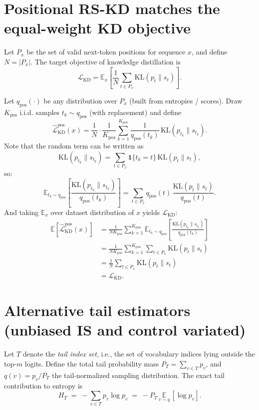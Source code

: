 \documentclass[11pt]{article}
\begin{document}



\appendix
\section{Positional RS-KD matches the equal-weight KD objective}
\label{app:pos-rs-kd-proof}

Let \(P_x\) be the set of valid next-token positions for sequence \(x\), and define \(N=\lvert P_x\rvert\).
The target objective of knowledge distillation is
\[
	\mathcal{L}_{\text{KD}}
	=\mathbb{E}_{x}\!\left[\frac{1}{N}\sum_{t\in P_x}\mathrm{KL}(p_t\|s_t)\right].
\]

Let \(q_{\text{pos}}(\cdot)\) be any distribution over \(P_x\) (built from entropies / scores).
Draw \(K_{\text{pos}}\) i.i.d. samples \(t_k\sim q_{\text{pos}}\) (with replacement) and define
\[
	\widehat{\mathcal{L}}_{\text{KD}}^{\text{pos}}(x)
	=\frac{1}{N}\cdot\frac{1}{K_{\text{pos}}}\sum_{k=1}^{K_{\text{pos}}}
	\frac{1}{q_{\text{pos}}(t_k)}\,\mathrm{KL}(p_{t_k}\|s_{t_k}).
\]
Note that the random term can be written as
\[
	\mathrm{KL}(p_{t_k}\|s_{t_k})
	=\sum_{t\in P_x}\mathbf{1}\!\{t_k=t\}\,\mathrm{KL}(p_t\|s_t),
\]
so:
\[
	\mathbb{E}_{t_k\sim q_{\text{pos}}}\!\left[
		\frac{\mathrm{KL}(p_{t_k}\|s_{t_k})}{q_{\text{pos}}(t_k)}
		\right]
	= \sum_{t\in P_x} q_{\text{pos}}(t)\,
	\frac{\mathrm{KL}(p_t\|s_t)}{q_{\text{pos}}(t)}.
\]
And taking \(\mathbb{E}_x\) over dataset distribution of \(x\) yields \(\mathcal{L}_{\text{KD}}\):
\begin{align*}
	\mathbb{E}\!\left[\widehat{\mathcal{L}}_{\text{KD}}^{\text{pos}}(x)\right]
	 & = \frac{1}{N K_{\text{pos}}}\sum_{k=1}^{K_{\text{pos}}}
	\mathbb{E}_{t_k\sim q_{\text{pos}}}\!\left[
		\frac{\mathrm{KL}(p_{t_k}\|s_{t_k})}{q_{\text{pos}}(t_k)}
	\right]                                                     \\
	 & = \frac{1}{N K_{\text{pos}}}\sum_{k=1}^{K_{\text{pos}}}
	\sum_{t\in P_x}\mathrm{KL}(p_t\|s_t)                        \\
	 & = \frac{1}{N}\sum_{t\in P_x}\mathrm{KL}(p_t\|s_t)        \\
	 & =\mathcal{L}_{\text{KD}}.
\end{align*}

\section{Alternative tail estimators (unbiased IS and control variated)}
\label{app:tail-IS}
Let \(T\) denote the \emph{tail index set}, i.e., the set of vocabulary indices lying outside the top-\(m\) logits.
Define the total tail probability mass $P_T=\sum_{v\in T}p_v$, and $q(v)=p_v/P_T$ the tail-normalized sampling distribution. The exact tail contribution to entropy is
\[
	H_T \;=\; -\sum_{v\in T} p_v \log p_v \;=\; -P_T\,\underset{v\sim q}{\mathbb{E}}\,[\log p_v].
\]
\end{document}
